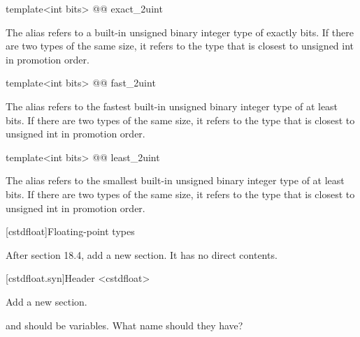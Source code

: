 \begin{addedblock}
\begin{itemdecl}
template<int bits> @@ exact_2uint    
\end{itemdecl}

\begin{itemdescr}
The alias  refers to a built-in unsigned binary integer type of exactly  bits. If there are two types of the same size, it refers to the type that is closest to unsigned int in promotion order.    
\end{itemdescr} 

\begin{itemdecl}
template<int bits> @@ fast_2uint    
\end{itemdecl}

\begin{itemdescr}
The alias  refers to the fastest built-in unsigned binary integer type of at least  bits. If there are two types of the same size, it refers to the type that is closest to unsigned int in promotion order.    
\end{itemdescr} 

\begin{itemdecl}
template<int bits> @@ least_2uint    
\end{itemdecl}

\begin{itemdescr}
The alias  refers to the smallest built-in unsigned binary integer type of at least  bits. If there are two types of the same size, it refers to the type that is closest to unsigned int in promotion order.    
\end{itemdescr}    
\end{addedblock}

[cstdfloat]{Floating-point types}

After section 18.4, add a new section. It has no direct contents.

[cstdfloat.syn]{Header <cstdfloat>}

Add a new section.

\begin{modifcommentblock}
 and  should be  variables. What name should they have?
\end{modifcommentblock}

